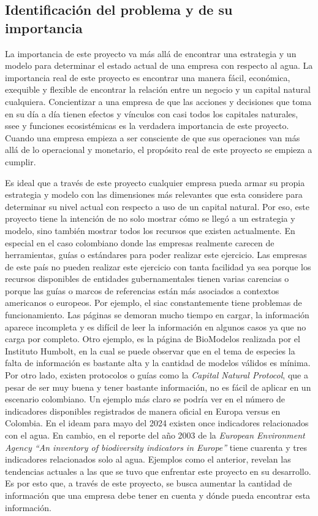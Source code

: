 \subsection{Identificación del problema y de su importancia} \label{subsec:identificacion-problema-importancia}
La importancia de este proyecto va más allá de encontrar una estrategia y un modelo para determinar el estado actual de una empresa con respecto al agua. La importancia real de este proyecto es encontrar una manera fácil, económica, exequible y flexible de encontrar la relación entre un negocio y un capital natural cualquiera. Concientizar a una empresa de que las acciones y decisiones que toma en su día a día tienen efectos y vínculos con casi todos los capitales naturales, \acrshort{ssee} y funciones ecosistémicas es la verdadera importancia de este proyecto. Cuando una empresa empieza a ser consciente de que sus operaciones van más allá de lo operacional y monetario, el propósito real de este proyecto se empieza a cumplir. 

\hfill

Es ideal que a través de este proyecto cualquier empresa pueda armar su propia estrategia y modelo con las dimensiones más relevantes que esta considere para determinar su nivel actual con respecto a uso de un capital natural. Por eso, este proyecto tiene la intención de no solo mostrar cómo se llegó a un estrategia y modelo, sino también mostrar todos los recursos que existen actualmente. En especial en el caso colombiano donde las empresas realmente carecen de herramientas, guías o estándares para poder realizar este ejercicio. Las empresas de este país no pueden realizar este ejercicio con tanta facilidad ya sea porque los recursos disponibles de entidades gubernamentales tienen varias carencias o porque las guías o marcos de referencias están más asociados a contextos americanos o europeos. Por ejemplo, el \acrfull{siac} constantemente tiene problemas de funcionamiento. Las páginas se demoran mucho tiempo en cargar, la información aparece incompleta y es difícil de leer la información en algunos casos ya que no carga por completo.  Otro ejemplo, es la página de BioModelos realizada por el Instituto Humbolt, en la cual se puede observar que en el tema de especies la falta de información es bastante alta y la cantidad de modelos válidos es mínima. Por otro lado, existen protocolos o guías como la \textit{Capital Natural Protocol}, que a pesar de ser muy buena y tener bastante información, no es fácil de aplicar en un escenario colombiano. Un ejemplo más claro se podría ver en el número de indicadores disponibles registrados de manera oficial en Europa versus en Colombia. En el \acrfull{ideam} para mayo del 2024 existen once indicadores relacionados con el agua. En cambio, en el reporte del año 2003 de la \textit{European Environment Agency “An inventory of biodiversity indicators in Europe”} tiene cuarenta y tres indicadores relacionados solo al agua. Ejemplos como el anterior, revelan las tendencias actuales a las que se tuvo que enfrentar este proyecto en su desarrollo. Es por esto que, a través de este proyecto, se busca aumentar la cantidad de información que una empresa debe tener en cuenta y dónde pueda encontrar esta información.

